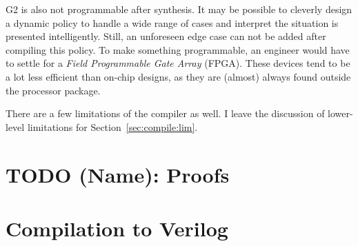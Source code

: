 \documentclass[sigconf,usenames,dvipsnames,svgnames,table]{acmart}
\def \sysname {\textsc{G2}\xspace}
\begin{document}
      \sysname is also not programmable after synthesis.
      It may be possible to cleverly design a dynamic policy to handle a wide range of cases and interpret the situation is presented intelligently.
      Still, an unforeseen edge case can not be added after compiling this policy.
      To make something programmable, an engineer would have to settle for a \textit{Field Programmable Gate Array} (FPGA).
      These devices tend to be a lot less efficient than on-chip designs, as they are (almost) always found outside the processor package.
      \par

      There are a few limitations of the compiler as well.
      I leave the discussion of lower-level limitations for Section~\ref{sec:compile:lim}.
  \section{TODO (Name): Proofs}\label{sec:proofs}






  \section{Compilation to Verilog}\label{sec:comp}
\end{document}
